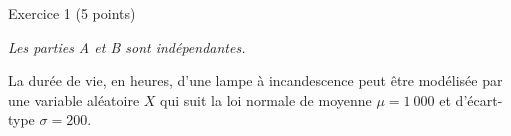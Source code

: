 
%
\begin{h2}Exercice 1 (5 points)\end{h2}
\par
\textit{Les parties A et B sont indépendantes.}
\par
%
%
\par
La durée de vie, en heures, d'une lampe à incandescence peut être modélisée par une variable aléatoire $X$ qui suit la loi normale de moyenne $\mu =1\ 000$ et d'écart-type $\sigma = 200$.
\par
